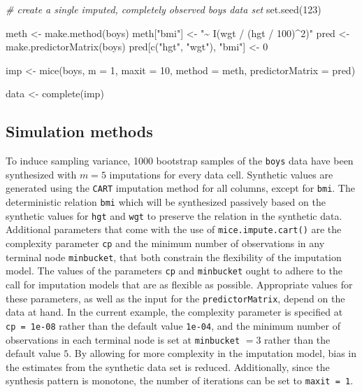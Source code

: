 \documentclass[psych,article,submit,moreauthors,pdftex]{mdpi}
\newenvironment{Shaded}{\begin{snugshade}}{\end{snugshade}}
\newcommand{\AttributeTok}[1]{\textcolor[rgb]{0.77,0.63,0.00}{#1}}
\newcommand{\CommentTok}[1]{\textcolor[rgb]{0.56,0.35,0.01}{\textit{#1}}}
\newcommand{\DecValTok}[1]{\textcolor[rgb]{0.00,0.00,0.81}{#1}}
\newcommand{\FunctionTok}[1]{\textcolor[rgb]{0.00,0.00,0.00}{#1}}
\newcommand{\NormalTok}[1]{#1}
\newcommand{\OtherTok}[1]{\textcolor[rgb]{0.56,0.35,0.01}{#1}}
\newcommand{\StringTok}[1]{\textcolor[rgb]{0.31,0.60,0.02}{#1}}
\begin{document}
\begin{Shaded}
\begin{Highlighting}[]
\CommentTok{\# create a single imputed, completely observed \textasciigrave{}boys\textasciigrave{} data set}
\FunctionTok{set.seed}\NormalTok{(}\DecValTok{123}\NormalTok{)}

\NormalTok{meth }\OtherTok{\textless{}{-}} \FunctionTok{make.method}\NormalTok{(boys)}
\NormalTok{meth[}\StringTok{"bmi"}\NormalTok{] }\OtherTok{\textless{}{-}} \StringTok{"\textasciitilde{} I(wgt / (hgt / 100)\^{}2)"}
\NormalTok{pred }\OtherTok{\textless{}{-}} \FunctionTok{make.predictorMatrix}\NormalTok{(boys)}
\NormalTok{pred[}\FunctionTok{c}\NormalTok{(}\StringTok{"hgt"}\NormalTok{, }\StringTok{"wgt"}\NormalTok{), }\StringTok{"bmi"}\NormalTok{] }\OtherTok{\textless{}{-}} \DecValTok{0}

\NormalTok{imp }\OtherTok{\textless{}{-}} \FunctionTok{mice}\NormalTok{(boys, }
            \AttributeTok{m =} \DecValTok{1}\NormalTok{,}
            \AttributeTok{maxit =} \DecValTok{10}\NormalTok{,}
            \AttributeTok{method =}\NormalTok{ meth,}
            \AttributeTok{predictorMatrix =}\NormalTok{ pred)}

\NormalTok{data }\OtherTok{\textless{}{-}} \FunctionTok{complete}\NormalTok{(imp)}
\end{Highlighting}
\end{Shaded}

\hypertarget{simulation-methods}{%
\subsection{Simulation methods}\label{simulation-methods}}

To induce sampling variance, 1000 bootstrap samples of the \texttt{boys}
data have been synthesized with \(m = 5\) imputations for every data
cell. Synthetic values are generated using the \texttt{CART} imputation
method for all columns, except for \texttt{bmi}. The deterministic
relation \texttt{bmi} which will be synthesized passively based on the
synthetic values for \texttt{hgt} and \texttt{wgt} to preserve the
relation in the synthetic data. Additional parameters that come with the
use of \texttt{mice.impute.cart()} are the complexity parameter
\texttt{cp} and the minimum number of observations in any terminal node
\texttt{minbucket}, that both constrain the flexibility of the
imputation model. The values of the parameters \texttt{cp} and
\texttt{minbucket} ought to adhere to the call for imputation models
that are as flexible as possible. Appropriate values for these
parameters, as well as the input for the \texttt{predictorMatrix},
depend on the data at hand. In the current example, the complexity
parameter is specified at \texttt{cp\ =\ 1e-08} rather than the default
value \texttt{1e-04}, and the minimum number of observations in each
terminal node is set at \texttt{minbucket} \(= 3\) rather than the
default value \(5\). By allowing for more complexity in the imputation
model, bias in the estimates from the synthetic data set is reduced.
Additionally, since the synthesis pattern is monotone, the number of
iterations can be set to \texttt{maxit\ =\ 1}.
\end{document}
